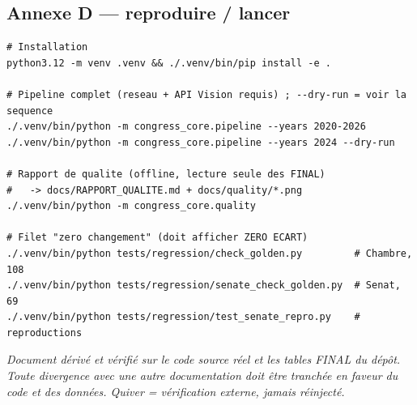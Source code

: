 \documentclass[11pt,a4paper]{article}
\begin{document}
\subsection{Annexe D — reproduire / lancer}
\label{anx:run}
{\footnotesize
\begin{verbatim}
# Installation
python3.12 -m venv .venv && ./.venv/bin/pip install -e .

# Pipeline complet (reseau + API Vision requis) ; --dry-run = voir la sequence
./.venv/bin/python -m congress_core.pipeline --years 2020-2026
./.venv/bin/python -m congress_core.pipeline --years 2024 --dry-run

# Rapport de qualite (offline, lecture seule des FINAL)
#   -> docs/RAPPORT_QUALITE.md + docs/quality/*.png
./.venv/bin/python -m congress_core.quality

# Filet "zero changement" (doit afficher ZERO ECART)
./.venv/bin/python tests/regression/check_golden.py         # Chambre, 108
./.venv/bin/python tests/regression/senate_check_golden.py  # Senat,    69
./.venv/bin/python tests/regression/test_senate_repro.py    # reproductions
\end{verbatim}}

\vfill
\begin{center}\footnotesize\itshape
Document dérivé et vérifié sur le code source réel et les tables FINAL du dépôt. Toute divergence avec
une autre documentation doit être tranchée en faveur du code et des données. Quiver = vérification
externe, jamais réinjecté.
\end{center}
\end{document}
